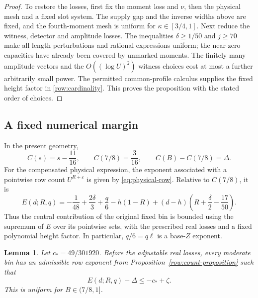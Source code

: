 \documentclass[11pt,a4paper]{article}
\numberwithin{equation}{section}
\newtheorem{lemma}[theorem]{Lemma}
\theoremstyle{definition}
\theoremstyle{remark}
\newcommand{\eps}{\varepsilon}
\begin{document}
\begin{proof}
To restore the losses, first fix the moment loss and \(\nu\), then
the physical mesh and a fixed slot system.  The supply gap and the
inverse widths above are fixed, and the fourth-moment mesh is uniform
for \(\kappa\in[3/4,1]\).  Next reduce the witness, detector and
amplitude losses.  The inequalities \(\delta\ge1/50\) and \(j\ge70\)
make all length perturbations and rational expressions uniform;
the near-zero capacities have already been covered by unmarked
moments.  The finitely many amplitude vectors and the
\(O((\log U)^2)\) witness choices cost at most a further arbitrarily
small power.  The permitted common-profile calculus supplies the
fixed height factor in \eqref{row:cardinality}.  This proves the
proposition with the stated order of choices.
\end{proof}

\subsection{A fixed numerical margin}
\label{row:certificate}

In the present geometry,
\[
 C(s)=s-\frac{11}{16},\qquad C(7/8)=\frac3{16},
 \qquad C(B)-C(7/8)=\Delta.
\]
For the compensated physical expression, the exponent associated with
a pointwise row count \(U^{R+\eps}\) is given by
\eqref{eq:physical-row}.  Relative to \(C(7/8)\), it is
\begin{equation}\label{row:physical-E}
 E(d;R,q)
 =-\frac1{48}+\frac{2\delta}{3}+\frac q6-h(1-R)
  +(d-h)\left(R+\frac\delta2-\frac{17}{50}\right).
\end{equation}
Thus the central contribution of the original fixed bin is bounded
using the supremum of \(E\) over its pointwise sets, with the prescribed
real losses and a fixed polynomial height factor.  In particular,
\(q/6=q\ell\) is a base-\(Z\) exponent.

\begin{lemma}\label{row:certificate-lemma}
Let \(c_*=49/301920\).  Before the adjustable real losses, every
moderate bin has an admissible row exponent from
Proposition~\ref{row:count-proposition} such that
\begin{equation}\label{row:uniform-saving}
 E(d;R,q)-\Delta\le-c_*+\zeta.
\end{equation}
This is uniform for \(B\in(7/8,1]\).
\end{lemma}
\end{document}
